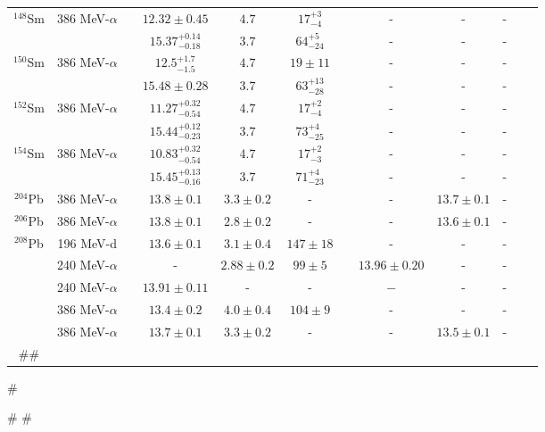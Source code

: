 \begin{table}[t!]
{\begin{tabular}{@{}cccccccccc@{}cc}
$^{148}$Sm & 386 MeV-$\alpha$ & & $12.32\pm0.45$& $4.7$ & ${17}^{+3}_{-4}$ & & - & - & - & & \cite{Itoh_prc2003}\\
  &  & & ${15.37}^{+0.14}_{-0.18}$ & $3.7$ & ${64}^{+5}_{-24}$ & & - & - & - & & \cite{Itoh_prc2003}\\
$^{150}$Sm & 386 MeV-$\alpha$ & & ${12.5}^{+1.7}_{-1.5}$& $4.7$ & $19\pm11$ & & - & - & - & & \cite{Itoh_prc2003}\\
  &  & & $15.48 \pm 0.28$ & $3.7$ & ${63}^{+13}_{-28}$ & & - & - & - & & \cite{Itoh_prc2003}\\
$^{152}$Sm & 386 MeV-$\alpha$ & & ${11.27}^{+0.32}_{-0.54}$ & $4.7$ & ${17}^{+2}_{-4}$ & & - & - & - & & \cite{Itoh_prc2003}\\
  &  & & ${15.44}^{+0.12}_{-0.23}$ & $3.7$ & ${73}^{+4}_{-25}$ & & - & - & - & & \cite{Itoh_prc2003}\\
$^{154}$Sm & 386 MeV-$\alpha$ & & ${10.83}^{+0.32}_{-0.54}$& $4.7$ & ${17}^{+2}_{-3}$ & & - & - & - & & \cite{Itoh_prc2003}\\
  &  & & ${15.45}^{+0.13}_{-0.16}$ & $3.7$ & ${71}^{+4}_{-23}$ & & - & - & - & & \cite{Itoh_prc2003}\\					
$^{204}$Pb & 386 MeV-$\alpha$ & & $13.8\pm0.1$ & $3.3\pm0.2$ & - & & - & $13.7\pm0.1$ & - & & \cite{Darshana2013} \\
$^{206}$Pb & 386 MeV-$\alpha$ & & $13.8\pm0.1$ & $2.8\pm0.2$ & - & & - & $13.6\pm0.1$ & - & &  \cite{Darshana2013} \\
$^{208}$Pb & 196 MeV-d & & $13.6\pm0.1$ & $3.1\pm0.4$ & $147\pm18$  & & - & - & - & & \cite{Darshana2015} \\
  & 240 MeV-$\alpha$ & & - & $2.88\pm0.2$ & $99\pm 5$ & & $13.96\pm 0.20$ & - & - & & \cite{dhybg}\\			
  & 240 MeV-$\alpha$ & & $13.91\pm0.11$ & - & -&& $-$ & - & - & & \cite{dhyprl}\\	
  & 386 MeV-$\alpha$ & & $13.4\pm0.2$ & $4.0\pm0.4$ & $104\pm9$ & & - & - & - & & \cite{Uchida_90Zr} \\	
  & 386 MeV-$\alpha$ & & $13.7\pm0.1$ & $3.3\pm0.2$ & - & & - & $13.5\pm0.1$ & - & & \cite{Darshana2013} \\
#\bottomrule[0.1ex]
#\end{tabular}
#}
#\label{ISGMR-table}
#\end{table}